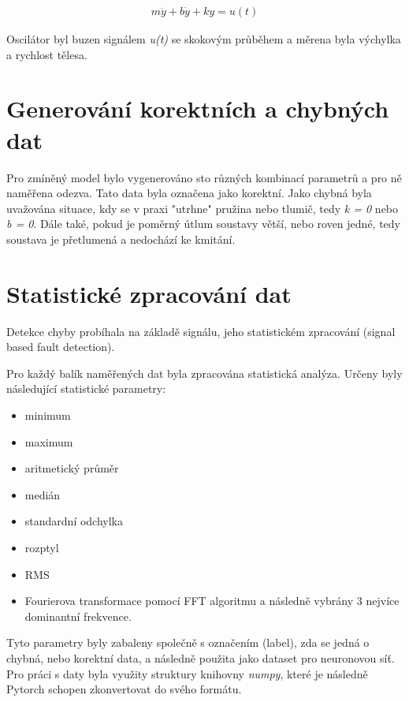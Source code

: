 \documentclass[11pt]{article}
\begin{document}
\begin{align*}
    m \ddot{y} + b \dot{y} + ky = u(t)
\end{align*}

Oscilátor byl buzen signálem \emph{u(t)} se skokovým průběhem a měrena
byla výchylka a rychlost tělesa.

\hypertarget{generovuxe1nuxed-korektnuxedch-a-chybnuxfdch-dat}{%
\section{Generování korektních a chybných
dat}\label{generovuxe1nuxed-korektnuxedch-a-chybnuxfdch-dat}}

Pro zmíněný model bylo vygenerováno sto různých kombinací parametrů a
pro ně naměřena odezva. Tato data byla označena jako korektní. Jako
chybná byla uvažována situace, kdy se v praxi "utrhne" pružina nebo
tlumič, tedy \emph{k = 0} nebo \emph{b = 0}. Dále také, pokud je poměrný
útlum soustavy větší, nebo roven jedné, tedy soustava je přetlumená a
nedochází ke kmitání.

\hypertarget{statistickuxe9-zpracovuxe1nuxed-dat}{%
\section{Statistické zpracování
dat}\label{statistickuxe9-zpracovuxe1nuxed-dat}}

Detekce chyby probíhala na základě signálu, jeho statistickém zpracování
(signal based fault detection).

Pro každý balík naměřených dat byla zpracována statistická analýza.
Určeny byly následující statistické parametry:

\begin{itemize}
\item
  minimum
\item
  maximum
\item
  aritmetický průměr
\item
  medián
\item
  standardní odchylka
\item
  rozptyl
\item
  RMS
\item
  Fourierova transformace pomocí FFT algoritmu a následně vybrány 3
  nejvíce dominantní frekvence.
\end{itemize}

Tyto parametry byly zabaleny společně s označením (label), zda se jedná
o chybná, nebo korektní data, a následně použita jako dataset pro
neuronovou síť. Pro práci s daty byla využity struktury knihovny
\emph{numpy}, které je následně Pytorch schopen zkonvertovat do svého
formátu.
\end{document}
